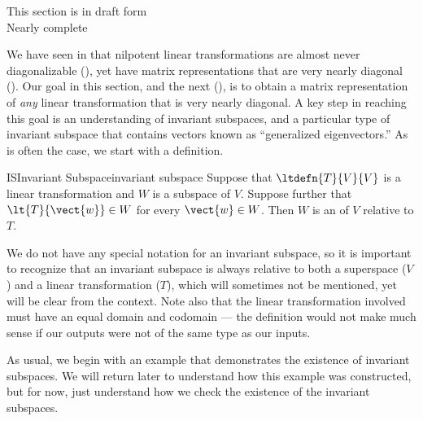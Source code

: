 %
{\sc\large This section is in draft form}\\
{\sc\large Nearly complete}
\par\medskip
%
We have seen in  that nilpotent linear transformations are almost never diagonalizable (), yet have matrix representations that are very nearly diagonal ().  Our goal in this section, and the next (), is to obtain a matrix representation of {\em any} linear transformation that is very nearly diagonal.  A key step in reaching this goal is an understanding of invariant subspaces, and a particular type of invariant subspace that contains vectors known as ``generalized eigenvectors.''
%
%
As is often the case, we start with a definition.
%
\begin{definition}{IS}{Invariant Subspace}{invariant subspace}
Suppose that $\ltdefn{T}{V}{V}$ is a linear transformation and $W$ is a subspace of $V$.  Suppose further that $\lt{T}{\vect{w}}\in W$ for every $\vect{w}\in W$.  Then $W$ is an  of $V$ relative to $T$.
\end{definition}
%
We do not have any special notation for an invariant subspace, so it is important to recognize that an invariant subspace is always relative to both a superspace ($V$) and a linear transformation ($T$), which will sometimes not be mentioned, yet will be clear from the context.  Note also that the linear transformation involved must have an equal domain and codomain --- the definition would not make much sense if our outputs were not of the same type as our inputs.\par
%
As usual, we begin with an example that demonstrates the existence of invariant subspaces.  We will return later to understand how this example was constructed, but for now, just understand how we check the existence of the invariant subspaces.
%
